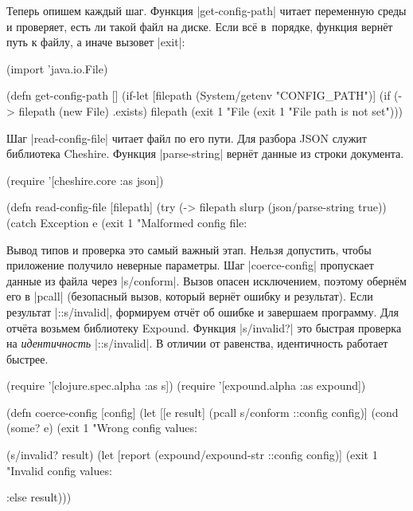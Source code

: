 Теперь опишем каждый шаг. Функция \spverb|get-config-path| читает переменную
среды и проверяет, есть ли такой файл на диске. Если вс\"{е} в~порядке, функция
верн\"{е}т путь к файлу, а иначе вызовет \spverb|exit|:


\begin{english}
  \begin{clojure}
(import 'java.io.File)

(defn get-config-path []
  (if-let [filepath (System/getenv "CONFIG_PATH")]
    (if (-> filepath (new File) .exists)
      filepath
      (exit 1 "File %
    (exit 1 "File path is not set")))
  \end{clojure}
\end{english}

Шаг \spverb|read-config-file| читает файл по его пути. Для разбора JSON служит
библиотека Cheshire. Функция \spverb|parse-string| верн\"{е}т данные из
строки документа.


\begin{english}
  \begin{clojure}
(require '[cheshire.core :as json])

(defn read-config-file
  [filepath]
  (try
    (-> filepath slurp (json/parse-string true))
    (catch Exception e
      (exit 1 "Malformed config file: %
  \end{clojure}
\end{english}


Вывод типов и проверка это самый важный этап. Нельзя допустить, чтобы приложение
получило неверные параметры. Шаг \spverb|coerce-config| пропускает данные из
файла через \spverb|s/conform|. Вызов опасен исключением, поэтому обернём его в
\spverb|pcall| (безопасный вызов, который верн\"{е}т ошибку и результат). Если
результат \spverb|::s/invalid|, формируем отч\"{е}т об ошибке и завершаем
программу. Для отч\"{е}та возьмем библиотеку Expound. Функция
\spverb|s/invalid?| это быстрая проверка на \emph{идентичность}
\spverb|::s/invalid|. В отличии от равенства, идентичность работает быстрее.

\begin{english}
  \begin{clojure}
(require '[clojure.spec.alpha :as s])
(require '[expound.alpha :as expound])

(defn coerce-config [config]
  (let [[e result] (pcall s/conform ::config config)]
    (cond
      (some? e)
      (exit 1 "Wrong config values: %

      (s/invalid? result)
      (let [report (expound/expound-str ::config config)]
        (exit 1 "Invalid config values: %

      :else result)))
  \end{clojure}
\end{english}

